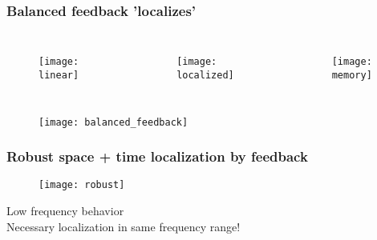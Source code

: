 \documentclass{beamer}
\begin{document}
\begin{frame}
\frametitle{Balanced feedback 'localizes'}
\vspace{-2ex}
\begin{columns}[c]

\begin{figure}
\texttt{[image: linear]}
\end{figure}
\\

\begin{figure}
\texttt{[image: localized]}
\end{figure}
\vspace{-5ex}
\\

\begin{figure}
\texttt{[image: memory]}
\end{figure}
\\

\end{columns}
\begin{figure}
\texttt{[image: balanced\_feedback]}
\end{figure}
\vspace{-2ex}
\end{frame}


\begin{frame}
\frametitle{Robust space + time localization by feedback}
\begin{figure}
\texttt{[image: robust]}
\end{figure}
Low frequency behavior\\
Necessary localization in same frequency range!
\end{frame}
\end{document}
